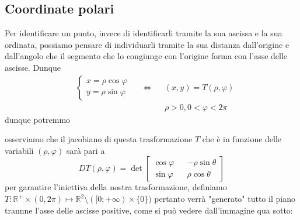 \subsection{Coordinate polari}
Per identificare un punto, invece di identificarli tramite la sua ascissa e la sua ordinata, possiamo pensare di individuarli tramite la sua distanza dall'origine e dall'angolo che il segmento che lo congiunge con
l'origine forma con l'asse delle ascisse. Dunque
\begin{align*}
&\begin{cases}
	x = \rho \cos{\varphi} \\
	y = \rho \sin{\varphi}
\end{cases} & &\iff & &(x, y) = T(\rho, \varphi) \\
& & & & &\rho > 0, 0 < \varphi < 2\pi
\end{align*}
dunque potremmo 
\begin{figure}[H]
	\centering
\end{figure}
osserviamo che il jacobiano di questa trasformazione $T$ che è in funzione delle variabili $(\rho, \varphi)$ sarà pari a
$$
DT(\rho, \varphi) = \det \begin{bmatrix} \cos{\varphi} && -\rho \sin{\theta} \\
	\sin{\varphi} && \rho \cos{\theta}
\end{bmatrix} 
$$
per garantire l'iniettiva della nostra trasformazione, definiamo $T: \mathbb{R}^+ \times (0, 2\pi) \mapsto \mathbb{R}^2 \setminus ([0; +\infty) \times \{0\})$ pertanto verrà "generato" tutto il piano trannne l'asse delle ascisse positive, come si può vedere dall'immagine qua sotto:
\begin{figure}[H]
	\centering
\end{figure}

